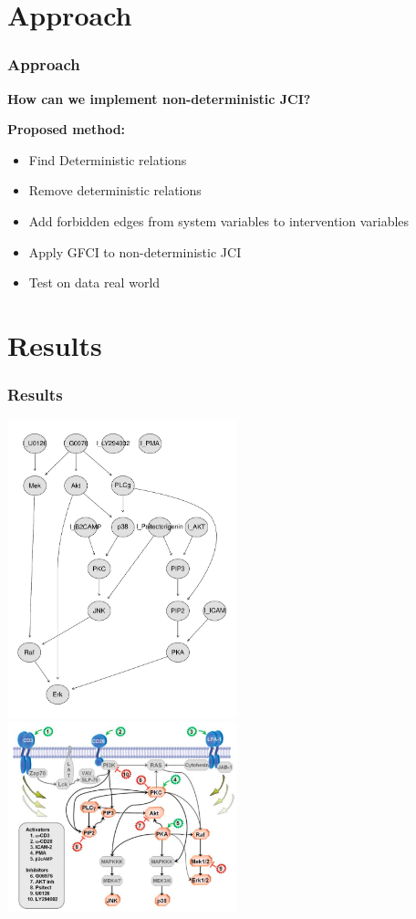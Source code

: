 \documentclass[10pt, compress]{beamer}
\begin{document}
\section{Approach}
\begin{frame}
    \frametitle{Approach}
    \textbf{How can we implement non-deterministic JCI?}
    \bigskip
    
    
    \textbf{Proposed method:}
    \begin{itemize}
        \item Find Deterministic relations
        \item Remove deterministic relations
        \item Add forbidden edges from system variables to intervention variables
        \item Apply GFCI to non-deterministic JCI
        \item Test on data real world
    \end{itemize}

\end{frame}


\section{Results}
\begin{frame}
    \frametitle{Results}
    \includegraphics[width=0.5\textwidth]{gfci_plot}%
    \includegraphics[width=0.5\textwidth]{sachs_plot}
\end{frame}
\end{document}
